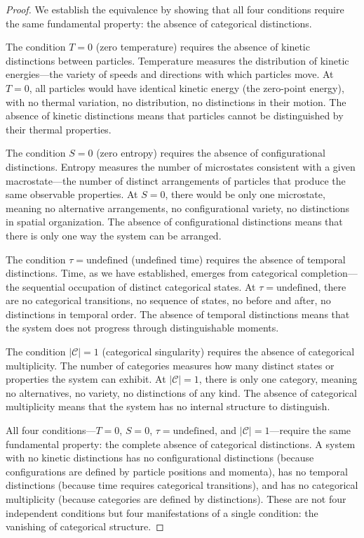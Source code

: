 \documentclass[12pt,a4paper]{article}
\theoremstyle{definition}
\theoremstyle{remark}
\begin{document}
\begin{proof}
We establish the equivalence by showing that all four conditions require the same fundamental property: the absence of categorical distinctions.

The condition $T = 0$ (zero temperature) requires the absence of kinetic distinctions between particles. Temperature measures the distribution of kinetic energies—the variety of speeds and directions with which particles move. At $T = 0$, all particles would have identical kinetic energy (the zero-point energy), with no thermal variation, no distribution, no distinctions in their motion. The absence of kinetic distinctions means that particles cannot be distinguished by their thermal properties.

The condition $S = 0$ (zero entropy) requires the absence of configurational distinctions. Entropy measures the number of microstates consistent with a given macrostate—the number of distinct arrangements of particles that produce the same observable properties. At $S = 0$, there would be only one microstate, meaning no alternative arrangements, no configurational variety, no distinctions in spatial organization. The absence of configurational distinctions means that there is only one way the system can be arranged.

The condition $\tau = \text{undefined}$ (undefined time) requires the absence of temporal distinctions. Time, as we have established, emerges from categorical completion—the sequential occupation of distinct categorical states. At $\tau = \text{undefined}$, there are no categorical transitions, no sequence of states, no before and after, no distinctions in temporal order. The absence of temporal distinctions means that the system does not progress through distinguishable moments.

The condition $|\mathcal{C}| = 1$ (categorical singularity) requires the absence of categorical multiplicity. The number of categories measures how many distinct states or properties the system can exhibit. At $|\mathcal{C}| = 1$, there is only one category, meaning no alternatives, no variety, no distinctions of any kind. The absence of categorical multiplicity means that the system has no internal structure to distinguish.

All four conditions—$T = 0$, $S = 0$, $\tau = \text{undefined}$, and $|\mathcal{C}| = 1$—require the same fundamental property: the complete absence of categorical distinctions. A system with no kinetic distinctions has no configurational distinctions (because configurations are defined by particle positions and momenta), has no temporal distinctions (because time requires categorical transitions), and has no categorical multiplicity (because categories are defined by distinctions). These are not four independent conditions but four manifestations of a single condition: the vanishing of categorical structure.


\end{proof}
\end{document}
